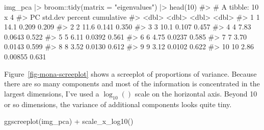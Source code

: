 \documentclass[
  letterpaper,
  10pt,
  krantz2]{krantz}
\makeatletter
\newenvironment{Shaded}{\begin{snugshade}}{\end{snugshade}}
\newcommand{\AttributeTok}[1]{\textcolor[rgb]{0.40,0.45,0.13}{#1}}
\newcommand{\CommentTok}[1]{\textcolor[rgb]{0.37,0.37,0.37}{#1}}
\newcommand{\DecValTok}[1]{\textcolor[rgb]{0.68,0.00,0.00}{#1}}
\newcommand{\FunctionTok}[1]{\textcolor[rgb]{0.28,0.35,0.67}{#1}}
\newcommand{\NormalTok}[1]{\textcolor[rgb]{0.00,0.23,0.31}{#1}}
\newcommand{\SpecialCharTok}[1]{\textcolor[rgb]{0.37,0.37,0.37}{#1}}
\newcommand{\StringTok}[1]{\textcolor[rgb]{0.13,0.47,0.30}{#1}}
\newenvironment{kframe}{%
  \medskip{}
  \setlength{\fboxsep}{.8em}
  \def\at@end@of@kframe{}%
  \ifinner\ifhmode%
  \def\at@end@of@kframe{\end{minipage}}%
  \begin{minipage}{\columnwidth}%
  \fi\fi%
  \def\FrameCommand##1{\hskip\@totalleftmargin \hskip-\fboxsep
  \colorbox{shadecolor}{##1}\hskip-\fboxsep
      \hskip-\linewidth \hskip-\@totalleftmargin \hskip\columnwidth}%
  \MakeFramed {\advance\hsize-\width
    \@totalleftmargin\z@ \linewidth\hsize
    \@setminipage}}%
{\par\unskip\endMakeFramed%
  \at@end@of@kframe}
\renewenvironment{Shaded}{\begin{kframe}}{\end{kframe}}
\makeatother
\begin{document}
\begin{Shaded}
\begin{Highlighting}[]
\NormalTok{img\_pca }\SpecialCharTok{|\textgreater{}}
\NormalTok{  broom}\SpecialCharTok{::}\FunctionTok{tidy}\NormalTok{(}\AttributeTok{matrix =} \StringTok{"eigenvalues"}\NormalTok{) }\SpecialCharTok{|\textgreater{}} \FunctionTok{head}\NormalTok{(}\DecValTok{10}\NormalTok{)}
\CommentTok{\#\textgreater{} \# A tibble: 10 x 4}
\CommentTok{\#\textgreater{}       PC std.dev percent cumulative}
\CommentTok{\#\textgreater{}    \textless{}dbl\textgreater{}   \textless{}dbl\textgreater{}   \textless{}dbl\textgreater{}      \textless{}dbl\textgreater{}}
\CommentTok{\#\textgreater{}  1     1   14.1  0.209        0.209}
\CommentTok{\#\textgreater{}  2     2   11.6  0.141        0.350}
\CommentTok{\#\textgreater{}  3     3   10.1  0.107        0.457}
\CommentTok{\#\textgreater{}  4     4    7.83 0.0643       0.522}
\CommentTok{\#\textgreater{}  5     5    6.11 0.0392       0.561}
\CommentTok{\#\textgreater{}  6     6    4.75 0.0237       0.585}
\CommentTok{\#\textgreater{}  7     7    3.70 0.0143       0.599}
\CommentTok{\#\textgreater{}  8     8    3.52 0.0130       0.612}
\CommentTok{\#\textgreater{}  9     9    3.12 0.0102       0.622}
\CommentTok{\#\textgreater{} 10    10    2.86 0.00855      0.631}
\end{Highlighting}
\end{Shaded}

Figure~\ref{fig-mona-screeplot} shows a screeplot of proportions of
variance. Because there are so many components and most of the
information is concentrated in the largest dimensions, I've used a
\(\log_{10}()\) scale on the horizontal axis. Beyond 10 or so
dimensions, the variance of additional components looks quite tiny.

\begin{Shaded}
\begin{Highlighting}[]
\FunctionTok{ggscreeplot}\NormalTok{(img\_pca) }\SpecialCharTok{+}
  \FunctionTok{scale\_x\_log10}\NormalTok{()}
\end{Highlighting}
\end{Shaded}
\end{document}
